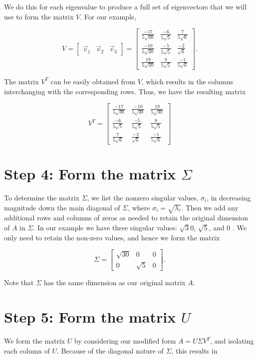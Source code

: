 \documentclass[10pt]{article}
\begin{document}
We do this for each eigenvalue to produce a full set of eigenvectors that we will use to form the matrix $V$. For our example,

$$
V=\left[\begin{array}{lll}
\vec{v}_{1} & \vec{v}_{2} & \vec{v}_{3}
\end{array}\right]=\left[\begin{array}{ccc}
\frac{-17}{5 \sqrt{30}} & \frac{-6}{5 \sqrt{5}} & \frac{7}{5 \sqrt{6}} \\
\frac{-10}{5 \sqrt{30}} & \frac{-5}{5 \sqrt{5}} & \frac{-2}{\sqrt{6}} \\
\frac{19}{5 \sqrt{30}} & \frac{8}{5 \sqrt{5}} & \frac{-1}{5 \sqrt{6}}
\end{array}\right] .
$$

The matrix $V^{T}$ can be easily obtained from $V$, which results in the columns interchanging with the corresponding rows. Thus, we have the resulting matrix

$$
V^{T}=\left[\begin{array}{ccc}
\frac{-17}{5 \sqrt{30}} & \frac{-10}{5 \sqrt{30}} & \frac{19}{5 \sqrt{30}} \\
\frac{-6}{5 \sqrt{5}} & \frac{-5}{5 \sqrt{5}} & \frac{8}{5 \sqrt{5}} \\
\frac{7}{5 \sqrt{6}} & \frac{-2}{\sqrt{6}} & \frac{-1}{5 \sqrt{6}}
\end{array}\right]
$$

\section*{Step 4: Form the matrix $\Sigma$}
To determine the matrix $\Sigma$, we list the nonzero singular values, $\sigma_{i}$, in decreasing magnitude down the main diagonal of $\Sigma$, where $\sigma_{i}=\sqrt{\lambda_{i}}$. Then we add any additional rows and columns of zeros as needed to retain the original dimension of $A$ in $\Sigma$. In our example we have three singular values: $\sqrt{3} 0$, $\sqrt{5}$, and 0 . We only need to retain the non-zero values, and hence we form the matrix

$$
\Sigma=\left[\begin{array}{ccc}
\sqrt{30} & 0 & 0 \\
0 & \sqrt{5} & 0
\end{array}\right] .
$$

Note that $\Sigma$ has the same dimension as our original matrix $A$.

\section*{Step 5: Form the matrix $U$}
We form the matrix $U$ by considering our modified form $A=U \Sigma V^{T}$, and isolating each column of $U$. Because of the diagonal nature of $\Sigma$, this results in
\end{document}
